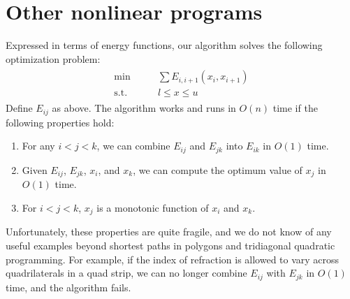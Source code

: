 \documentclass[11pt]{article}
\begin{document}
\section{Other nonlinear programs}

Expressed in terms of energy functions, our algorithm solves the following optimization problem:
\begin{align*}
\begin{array}{cc}
\min          \qquad& \sum E_{i,i+1}(x_i,x_{i+1}) \\
\textrm{s.t.} & l \le x \le u
\end{array}
\end{align*}
Define $E_{ij}$ as above.  The algorithm works and runs in $O(n)$ time if the following properties hold:
\begin{enumerate}
\item For any $i < j < k$, we can combine $E_{ij}$ and $E_{jk}$ into $E_{ik}$ in $O(1)$ time.
\item Given $E_{ij}$, $E_{jk}$, $x_i$, and $x_k$, we can compute the optimum value of $x_j$ in $O(1)$ time.
\item For $i < j < k$, $x_j$ is a monotonic function of $x_i$ and $x_k$.
\end{enumerate}
Unfortunately, these properties are quite fragile, and we do not know of any useful examples beyond shortest paths in polygons and tridiagonal quadratic programming.  For example, if the index of
refraction is allowed to vary across quadrilaterals in a quad strip, we can no longer combine $E_{ij}$ with $E_{jk}$ in $O(1)$ time, and the algorithm fails.



\end{document}
